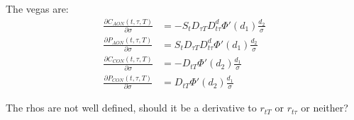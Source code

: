 The vegas are:
\begin{align}
	\frac{\partial C_{AON}(t,\tau,T)}{\partial \sigma}  
	  &= - S_t D_{\tau T} D_{t\tau}^d \Phi'(d_1) \frac{d_2}{\sigma}   \\
	\frac{\partial P_{AON}(t,\tau,T)}{\partial \sigma}  
	  &= S_t D_{\tau T} D_{t\tau}^d \Phi'(d_1) \frac{d_2}{\sigma}   \\
	\frac{\partial C_{CON}(t,\tau,T)}{\partial \sigma}  
	  &= - D_{tT} \Phi'(d_2) \frac{d_1}{\sigma}   \\
	\frac{\partial P_{CON}(t,\tau,T)}{\partial \sigma}  
    &= D_{tT} \Phi'(d_2) \frac{d_1}{\sigma}   
\end{align}

The rhos are not well defined, should it be a derivative to $r_{tT}$ or
$r_{t\tau}$ or neither?







